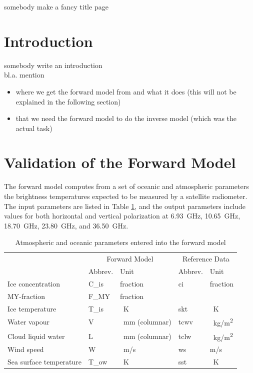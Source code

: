 \documentclass[11pt, a4paper]{article}
\begin{document}
\begin{titlepage}
\centering
{somebody make a fancy title page}
\end{titlepage}










\newpage
\section{Introduction}

somebody write an introduction \\

bl.a. mention
\begin{itemize}
\item where we get the forward model from and what it does (this will not be explained in the following section)
\item that we need the forward model to do the inverse model (which was the actual task)
\end{itemize}






\newpage
\section{Validation of the Forward Model}

The forward model computes from a set of oceanic and atmospheric parameters the brightness temperatures expected to be measured by a satellite radiometer. The input parameters are listed in Table \ref{tab:input_parameters}, and the output parameters include values for both horizontal and vertical polarization at \SI{6.93}{GHz}, \SI{10.65}{GHz}, \SI{18.70}{GHz}, \SI{23.80}{GHz}, and \SI{36.50}{GHz}.

\begin{table}[h!]
\centering
\begin{tabular}{@{}p{4cm} p{1.8cm}p{2.8cm}p{1.8cm}p{1.8cm}@{}}
\tabularnewline
& \multicolumn{2}{c}{Forward Model} & \multicolumn{2}{c}{Reference Data}
\tabularnewline
\cmidrule(r{1em}){2-3} \cmidrule(l{1em}){4-5}
& Abbrev. & Unit & Abbrev. & Unit
\tabularnewline
\midrule
Ice concentration	& C\_is	& fraction		& ci	& fraction	\\
MY-fraction		& F\_MY	& fraction		& 	& 		\\
Ice temperature		& T\_is	& \SI{}{K}	& skt	& \SI{}{K}	\\
Water vapour		& V	& \SI{}{mm} (columnar)	& tcwv	& \SI{}{kg/m^2}	\\
Cloud liquid water	& L	& \SI{}{mm} (columnar)	& tclw	& \SI{}{kg/m^2}	\\
Wind speed		& W	& \SI{}{m/s}		& ws	& m/s		\\
Sea surface temperature	& T\_ow	& \SI{}{K}	& sst	& \SI{}{K}	\\
\midrule
\end{tabular}
\caption{Atmospheric and oceanic parameters entered into the forward model}
\label{tab:input_parameters}
\end{table}
\end{document}
